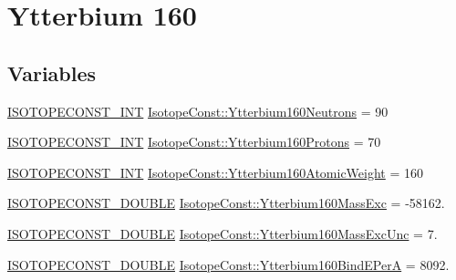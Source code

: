 \hypertarget{group___isotope_const-_ytterbium-_yb160}{}\section{Ytterbium 160}
\label{group___isotope_const-_ytterbium-_yb160}
\subsection*{Variables}
\begin{DoxyCompactItemize}
\item 
\mbox{\hyperlink{group___isotope_const-_macros_ga5f18360b3e99483a35c32d789e62621c}{I\+S\+O\+T\+O\+P\+E\+C\+O\+N\+S\+T\+\_\+\+I\+NT}} \mbox{\hyperlink{group___isotope_const-_ytterbium-_yb160_gae416237763b373c41687beda01506bbc}{Isotope\+Const\+::\+Ytterbium160\+Neutrons}} = 90
\item 
\mbox{\hyperlink{group___isotope_const-_macros_ga5f18360b3e99483a35c32d789e62621c}{I\+S\+O\+T\+O\+P\+E\+C\+O\+N\+S\+T\+\_\+\+I\+NT}} \mbox{\hyperlink{group___isotope_const-_ytterbium-_yb160_gaba87e2b17cdd8f33b6bca563fc1c2d41}{Isotope\+Const\+::\+Ytterbium160\+Protons}} = 70
\item 
\mbox{\hyperlink{group___isotope_const-_macros_ga5f18360b3e99483a35c32d789e62621c}{I\+S\+O\+T\+O\+P\+E\+C\+O\+N\+S\+T\+\_\+\+I\+NT}} \mbox{\hyperlink{group___isotope_const-_ytterbium-_yb160_ga20f7f8f4f40c8ba1d57d38c24bb5c6d0}{Isotope\+Const\+::\+Ytterbium160\+Atomic\+Weight}} = 160
\item 
\mbox{\hyperlink{group___isotope_const-_macros_ga8f45a7272ce02c0b4c65c44636ed719a}{I\+S\+O\+T\+O\+P\+E\+C\+O\+N\+S\+T\+\_\+\+D\+O\+U\+B\+LE}} \mbox{\hyperlink{group___isotope_const-_ytterbium-_yb160_ga539b09cb10f2938ecec7c2fa715cd742}{Isotope\+Const\+::\+Ytterbium160\+Mass\+Exc}} = -\/58162.
\item 
\mbox{\hyperlink{group___isotope_const-_macros_ga8f45a7272ce02c0b4c65c44636ed719a}{I\+S\+O\+T\+O\+P\+E\+C\+O\+N\+S\+T\+\_\+\+D\+O\+U\+B\+LE}} \mbox{\hyperlink{group___isotope_const-_ytterbium-_yb160_ga4eec666b8d1ba6c9259f763f81490bf4}{Isotope\+Const\+::\+Ytterbium160\+Mass\+Exc\+Unc}} = 7.
\item 
\mbox{\hyperlink{group___isotope_const-_macros_ga8f45a7272ce02c0b4c65c44636ed719a}{I\+S\+O\+T\+O\+P\+E\+C\+O\+N\+S\+T\+\_\+\+D\+O\+U\+B\+LE}} \mbox{\hyperlink{group___isotope_const-_ytterbium-_yb160_ga0da5aeedfa6801924ba3e649cae5803a}{Isotope\+Const\+::\+Ytterbium160\+Bind\+E\+PerA}} = 8092.
\item 

\end{DoxyCompactItemize}
